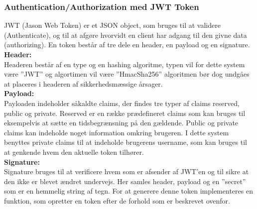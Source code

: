 \subsubsection{Authentication/Authorization med JWT Token}
JWT (Jason Web Token) er et JSON object, som bruges til at validere (Authenticate), og til at afgøre hvorvidt en client har adgang til den givne data (authorizing). En token består af tre dele en header, en payload og en signature.\\

\textbf{Header:}\\
Headeren består af en type og en hashing algoritme, typen vil for dette system være ”JWT” og algortimen vil være ”HmacSha256” algoritmen bør dog undgåes at placeres i headeren af sikkerhedsmæssige årsager.\\

\textbf{Payload:}\\

Payloaden indeholder såkaldte claims, der findes tre typer af claims reserved, public og private. Reserved er en række prædefineret claims som kan bruges til eksempelvis at sætte en tidsbegrænsning på den gældende. Public og private claims kan indeholde noget information omkring brugeren. I dette system benyttes private claims til at indeholde brugerens username, som kan bruges til at genkende hvem den aktuelle token tilhører.\\

\textbf{Signature:}\\
Signature bruges til at verificere hvem som er afsender af JWT’en og til sikre at den ikke er blevet ændret undervejs. Her samles header, payload og en ”secret” som er en hemmelig string af tegn.
For at generere denne token implementeres en funktion, som opretter en token efter de forhold som er beskrevet ovenfor.\\


